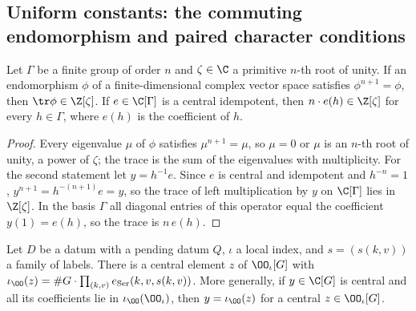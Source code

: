 \subsection{Uniform constants: the commuting endomorphism and paired character conditions}\label{sec:pf:linkN:extra}

\begin{lemma}\label{pf:linkN:cenidem}
Let $\Gamma$ be a finite group of order $n$ and $\zeta\in\C$ a primitive $n$-th root of unity. If an endomorphism $\phi$ of a
finite-dimensional complex vector space satisfies $\phi^{n+1}=\phi$, then $\tr\phi\in\Z[\zeta]$. If $e\in\C[\Gamma]$ is a central
idempotent, then $n\cdot e(h)\in\Z[\zeta]$ for every $h\in\Gamma$, where $e(h)$ is the coefficient of $h$.
\end{lemma}

\begin{proof}
Every eigenvalue $\mu$ of $\phi$ satisfies $\mu^{n+1}=\mu$, so $\mu=0$ or $\mu$ is an $n$-th root of unity, a power of $\zeta$; the
trace is the sum of the eigenvalues with multiplicity. For the second statement let $y=h^{-1}e$. Since $e$ is central and
idempotent and $h^{-n}=1$, $y^{n+1}=h^{-(n+1)}e=y$, so the trace of left multiplication by $y$ on $\C[\Gamma]$ lies in $\Z[\zeta]$. In
the basis $\Gamma$ all diagonal entries of this operator equal the coefficient $y(1)=e(h)$, so the trace is $n\,e(h)$.
\end{proof}

\begin{lemma}\label{pf:linkN:centralelt}
Let $D$ be a datum with a pending datum $Q$, $\iota$ a local index, and $s=(s(k,v))$ a family of labels. There is a central element
$z$ of $\OO_\iota[G]$ with $\iota_\OO(z)=\#G\cdot\prod_{(k,v)}e_{\mathrm{Ser}}(k,v,s(k,v))$. More generally, if $y\in\C[G]$ is
central and all its coefficients lie in $\iota_\OO(\OO_\iota)$, then $y=\iota_\OO(z)$ for a central $z\in\OO_\iota[G]$.
\end{lemma}

